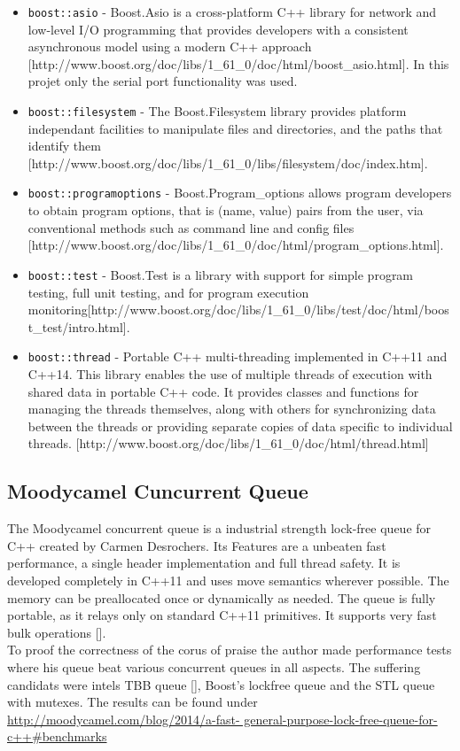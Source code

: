 \begin{itemize}
\item \texttt{boost::asio} - Boost.Asio is a cross-platform C++ library for network and low-level I/O programming that provides developers with a consistent asynchronous model using a modern C++ approach [http://www.boost.org/doc/libs/1\_61\_0/doc/html/boost\_asio.html]. In this projet only the serial port functionality was used.
\item \texttt{boost::filesystem} - The Boost.Filesystem library provides platform independant facilities to manipulate files and directories, and the paths that identify them [http://www.boost.org/doc/libs/1\_61\_0/libs/filesystem/doc/index.htm].
\item \texttt{boost::programoptions} - Boost.Program\_options allows program developers to obtain program options, that is (name, value) pairs from the user, via conventional methods such as command line and config files [http://www.boost.org/doc/libs/1\_61\_0/doc/html/program\_options.html]. 
\item \texttt{boost::test} - Boost.Test is a library with support for simple program testing, full unit testing, and for program execution monitoring[http://www.boost.org/doc/libs/1\_61\_0/libs/test/doc/html/boost\_test/intro.html].
\item \texttt{boost::thread} - Portable C++ multi-threading implemented in C++11 and C++14. This library  enables the use of multiple threads of execution with shared data in portable C++ code. It provides classes and functions for managing the threads themselves, along with others for synchronizing data between the threads or providing separate copies of data specific to individual threads. [http://www.boost.org/doc/libs/1\_61\_0/doc/html/thread.html]
\end{itemize}
\subsection{Moodycamel Cuncurrent Queue}
The Moodycamel concurrent queue is a industrial strength lock-free queue for C++ created by Carmen Desrochers. Its Features are a unbeaten fast performance, a single header implementation and full thread safety. It is developed completely in C++11 and uses move semantics wherever possible. The memory can be preallocated once or dynamically as needed. The queue is fully portable, as it relays only on standard C++11 primitives. It supports very fast bulk operations [].\\
To proof the correctness of the corus of praise the author made performance tests where his queue beat various concurrent queues in all aspects. The suffering candidats were intels TBB queue [], Boost's lockfree queue and the STL queue with mutexes. The results can be found under \url{http://moodycamel.com/blog/2014/a-fast-
general-purpose-lock-free-queue-for-c++#benchmarks}


